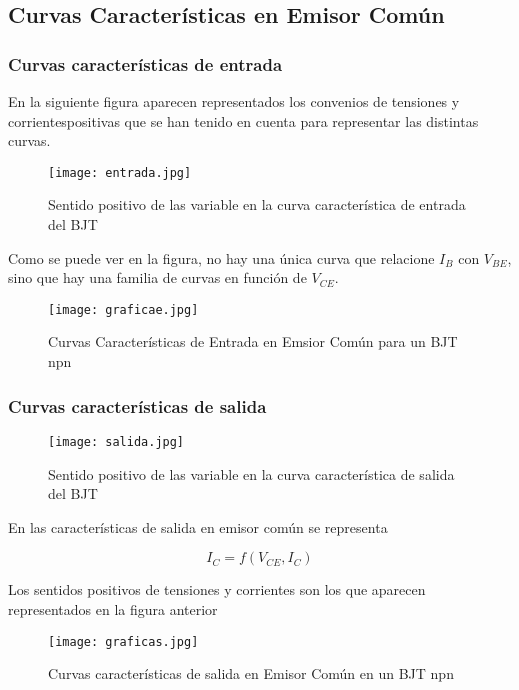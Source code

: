 \documentclass[10pt, a4paper]{article}
\begin{document}
    \subsection{Curvas Características en Emisor Común}

    \subsubsection{Curvas características de entrada}

    En la siguiente figura aparecen representados los convenios de tensiones y corrientespositivas que se han tenido en cuenta para representar las distintas curvas.

    \begin{figure}[h!]
        \centering
        \texttt{[image: entrada.jpg]}
        \caption{\label{fig:3} Sentido positivo de las variable en la curva característica de entrada del BJT}
    \end{figure}

    Como se puede ver en la figura, no hay una única curva que relacione $I_B$ con $V_{BE}$, sino que hay una familia de curvas en función de $V_{CE}$.

    \begin{figure}[h!]
        \centering
        \texttt{[image: graficae.jpg]}
        \caption{\label{fig:4} Curvas Características de Entrada en Emsior Común para un BJT npn}
    \end{figure}

    \subsubsection{Curvas características de salida}

    \begin{figure}[h!]
        \centering
        \texttt{[image: salida.jpg]}
        \caption{\label{fig:5} Sentido positivo de las variable en la curva característica de salida del BJT}
    \end{figure}

    En las características de salida en emisor común se representa
    
    $$I_C = f(V_{CE}, I_C)$$

    Los sentidos positivos de tensiones y corrientes son los que aparecen representados en la figura anterior

    \begin{figure}[h!]
        \centering
        \texttt{[image: graficas.jpg]}
        \caption{\label{fig:6} Curvas características de salida en Emisor Común en un BJT npn}
    \end{figure}
\end{document}
